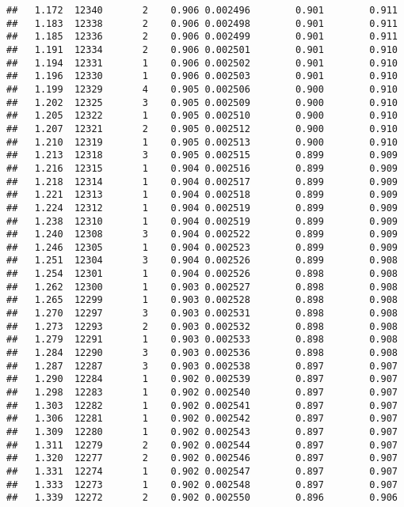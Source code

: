 \documentclass[
]{book}
\begin{document}
\begin{verbatim}
##   1.172  12340       2    0.906 0.002496        0.901        0.911
##   1.183  12338       2    0.906 0.002498        0.901        0.911
##   1.185  12336       2    0.906 0.002499        0.901        0.911
##   1.191  12334       2    0.906 0.002501        0.901        0.910
##   1.194  12331       1    0.906 0.002502        0.901        0.910
##   1.196  12330       1    0.906 0.002503        0.901        0.910
##   1.199  12329       4    0.905 0.002506        0.900        0.910
##   1.202  12325       3    0.905 0.002509        0.900        0.910
##   1.205  12322       1    0.905 0.002510        0.900        0.910
##   1.207  12321       2    0.905 0.002512        0.900        0.910
##   1.210  12319       1    0.905 0.002513        0.900        0.910
##   1.213  12318       3    0.905 0.002515        0.899        0.909
##   1.216  12315       1    0.904 0.002516        0.899        0.909
##   1.218  12314       1    0.904 0.002517        0.899        0.909
##   1.221  12313       1    0.904 0.002518        0.899        0.909
##   1.224  12312       1    0.904 0.002519        0.899        0.909
##   1.238  12310       1    0.904 0.002519        0.899        0.909
##   1.240  12308       3    0.904 0.002522        0.899        0.909
##   1.246  12305       1    0.904 0.002523        0.899        0.909
##   1.251  12304       3    0.904 0.002526        0.899        0.908
##   1.254  12301       1    0.904 0.002526        0.898        0.908
##   1.262  12300       1    0.903 0.002527        0.898        0.908
##   1.265  12299       1    0.903 0.002528        0.898        0.908
##   1.270  12297       3    0.903 0.002531        0.898        0.908
##   1.273  12293       2    0.903 0.002532        0.898        0.908
##   1.279  12291       1    0.903 0.002533        0.898        0.908
##   1.284  12290       3    0.903 0.002536        0.898        0.908
##   1.287  12287       3    0.903 0.002538        0.897        0.907
##   1.290  12284       1    0.902 0.002539        0.897        0.907
##   1.298  12283       1    0.902 0.002540        0.897        0.907
##   1.303  12282       1    0.902 0.002541        0.897        0.907
##   1.306  12281       1    0.902 0.002542        0.897        0.907
##   1.309  12280       1    0.902 0.002543        0.897        0.907
##   1.311  12279       2    0.902 0.002544        0.897        0.907
##   1.320  12277       2    0.902 0.002546        0.897        0.907
##   1.331  12274       1    0.902 0.002547        0.897        0.907
##   1.333  12273       1    0.902 0.002548        0.897        0.907
##   1.339  12272       2    0.902 0.002550        0.896        0.906

\end{verbatim}
\end{document}
